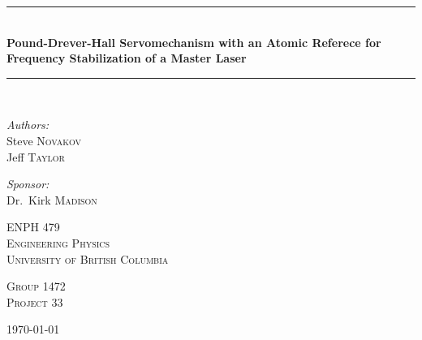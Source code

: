 \documentclass[10.5pt, a4paper, twoside]{article}
\newcommand{\HRule}{\rule{\linewidth}{0.5mm}}
\begin{document}
%
%

\begin{titlepage}
\begin{center}


\HRule \\[0.4cm]
{ \huge \bfseries Pound-Drever-Hall Servomechanism with an Atomic Referece for Frequency Stabilization of a Master Laser \\[0.4cm] }

\HRule \\[2.5cm]

\begin{minipage}{0.4\textwidth}
\begin{flushleft} \Large
\Large \emph{Authors:}\\
Steve \textsc{Novakov} \\
Jeff \textsc{Taylor}
\end{flushleft}
\end{minipage}
\begin{minipage}{0.4\textwidth}
\begin{flushright} \Large
\emph{Sponsor:} \\
Dr.~Kirk \textsc{Madison}
\end{flushright}
\end{minipage}

\vfill

\textsc{\LARGE ENPH 479}\\[0.3cm]
\textsc{\LARGE Engineering Physics}\\[0.3cm]
\textsc{\LARGE University of British Columbia}\\[0.3cm]

\vfill

\textsc{\Large Group 1472}\\[0.3cm]
\textsc{\Large Project 33}\\[0.3cm]

\vfill

{\large \today}

\end{center}
\end{titlepage}
\newpage
\end{document}

